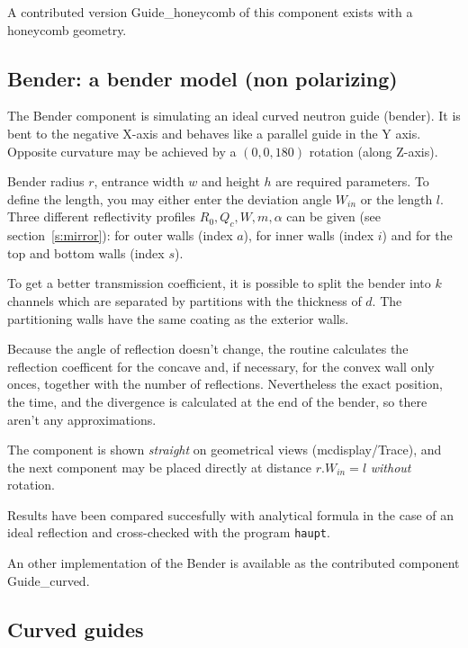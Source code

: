 A contributed version Guide\_honeycomb of this component exists with a honeycomb geometry.

\subsection*{Bender: a bender model (non polarizing)}


The Bender component is simulating an ideal curved neutron guide (bender). It is bent to the negative X-axis and behaves like a parallel guide in the Y axis. Opposite curvature may be achieved by a $(0,0,180)$ rotation (along Z-axis).

Bender radius $r$, entrance width $w$ and height $h$ are required parameters. To define the length, you may either enter the deviation angle $W_{in}$ or the length $l$. Three different reflectivity profiles $R_0,Q_c,W,m,\alpha$ can be given (see section~\ref{s:mirror}): for outer
walls (index $a$), for inner walls (index $i$) and for the top and bottom walls (index $s$).

To get a better transmission coefficient, it is possible to split the bender into $k$ channels which are separated by partitions with the thickness of $d$. The partitioning walls have the same coating as the exterior walls.

Because the angle of reflection doesn't change, the routine
calculates the reflection coefficent for the concave and, if necessary, for the convex wall only onces, together with the number of reflections.
Nevertheless the exact position, the time, and the divergence is calculated at the end of the bender, so there aren't any approximations.

The component is shown \emph{straight} on geometrical views (mcdisplay/Trace), and the next component may be placed directly at distance $r.W_{in} = l$ \emph{without} rotation.

Results have been compared succesfully with analytical formula in the case of an ideal reflection and cross-checked with the program \verb+haupt+.

An other implementation of the Bender is available as the contributed component Guide\_curved.

\subsection*{Curved guides}

